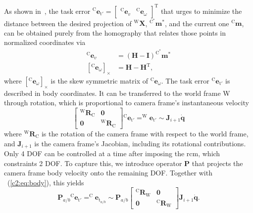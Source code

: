 As shown in~\cite{benhimane2006homography}, the task error $^\text{C}\mathbf{e}_{\text{t}'} = \begin{bmatrix}^\text{C}\mathbf{e}_v & ^\text{C}\mathbf{e}_\omega\end{bmatrix}^\text{T}$ that urges to minimize the distance between the desired projection of $^\text{W}\mathbf{X}$, $^{\text{C}^*}\mathbf{m}^*$, and the current one $^\text{C}\mathbf{m}$, can be obtained purely from the homography that relates those points in normalized coordinates via
\begin{equation}
    \begin{split}
        ^\text{C}\mathbf{e}_v & = (\mathbf{H} - \mathbf{I})^{\text{C}^*}\mathbf{m}^*\\
        \left[^\text{C}\mathbf{e}_\omega\right]_\times & = \mathbf{H} - \mathbf{H}^\text{T},
    \end{split}
    \label{c2:eq:dc}
\end{equation}
where $\left[^\text{C}\mathbf{e}_\omega\right]_\times$ is the skew symmetric matrix of $^\text{C}\mathbf{e}_\omega$. The task error $^\text{C}\mathbf{e}_{\text{t}'}$ is described in body coordinates. It can be transferred to the world frame W through rotation, which is proportional to camera frame's instantaneous velocity
\begin{equation}
    \begin{bmatrix}^\text{W}\mathbf{R}_\text{C} & \mathbf{0} \\ \mathbf{0} & ^\text{W}\mathbf{R}_\text{C}\end{bmatrix}{^\text{C}\mathbf{e}_{\text{t}'}} = ^\text{W}\mathbf{e}_{\text{t}'} \sim \mathbf{J}_{i+1}\dot{\mathbf{q}}
    \label{c2:eq:body}
\end{equation}
where $^\text{W}\mathbf{R}_\text{C}$ is the rotation of the camera frame with respect to the world frame, and $\mathbf{J}_{i+1}$ is the camera frame's Jacobian, including its rotational contributions. Only 4 DOF can be controlled at a time after imposing the \acrshort{rcm}, which constraints 2 DOF. To capture this, we introduce operator $\mathbf{P}$ that projects the camera frame body velocity onto the remaining DOF. Together with \ (\eqref{c2:eq:body}), this yields
\begin{equation}
    \mathbf{P}_{a/b}{^\text{C}\mathbf{e}_{\text{t}'}} = ^\text{C}\mathbf{e}_{\text{t}_{a/b}} \sim \mathbf{P}_{a/b} \begin{bmatrix}^\text{C}\mathbf{R}_\text{W} & \mathbf{0} \\ \mathbf{0} & ^\text{C}\mathbf{R}_\text{W}\end{bmatrix}\mathbf{J}_{i+1}\dot{\mathbf{q}}.
    \label{c2:eq:proj}
\end{equation}
